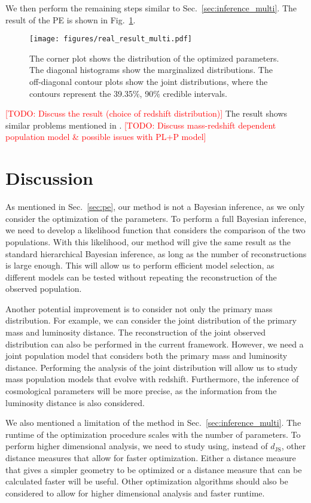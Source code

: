 \documentclass[sn-aps, pdflatex]{sn-jnl}
\newcommand{\todo}[1]{\textcolor{red}{[TODO: #1]}}
\begin{document}
We then perform the remaining steps similar to Sec.~\ref{sec:inference_multi}.
The result of the \ac{PE} is shown in Fig.~\ref{fig:real_result_multi}.
\begin{figure}[htbp]
    \texttt{[image: figures/real\_result\_multi.pdf]}
    \caption{
        The corner plot shows the distribution of the optimized parameters.
        The diagonal histograms show the marginalized distributions.
        The off-diagonal contour plots show the joint distributions, where the contours represent the 39.35\%, 90\% credible intervals.
    }
    \label{fig:real_result_multi}
\end{figure}
\todo{Discuss the result (choice of redshift distribution)}
The result shows similar problems mentioned in \cite{Pierra:2023deu}.
\todo{Discuss mass-redshift dependent population model \& possible issues with PL+P model}

\section{Discussion}
\label{sec:discussion}

As mentioned in Sec.~\ref{sec:pe}, our method is not a Bayesian inference, as we only consider the optimization of the parameters.
To perform a full Bayesian inference, we need to develop a likelihood function that considers the comparison of the two populations.
With this likelihood, our method will give the same result as the standard hierarchical Bayesian inference, as long as the number of reconstructions is large enough.
This will allow us to perform efficient model selection, as different models can be tested without repeating the reconstruction of the observed population.

Another potential improvement is to consider not only the primary mass distribution.
For example, we can consider the joint distribution of the primary mass and luminosity distance.
The reconstruction of the joint observed distribution can also be performed in the current framework.
However, we need a joint population model that considers both the primary mass and luminosity distance.
Performing the analysis of the joint distribution will allow us to study mass population models that evolve with redshift.
Furthermore, the inference of cosmological parameters will be more precise, as the information from the luminosity distance is also considered.

We also mentioned a limitation of the method in Sec.~\ref{sec:inference_multi}.
The runtime of the optimization procedure scales with the number of parameters.
To perform higher dimensional analysis, we need to study using, instead of $d_\mathrm{JS}$, other distance measures that allow for faster optimization.
Either a distance measure that gives a simpler geometry to be optimized or a distance measure that can be calculated faster will be useful.
Other optimization algorithms should also be considered to allow for higher dimensional analysis and faster runtime.
\end{document}
